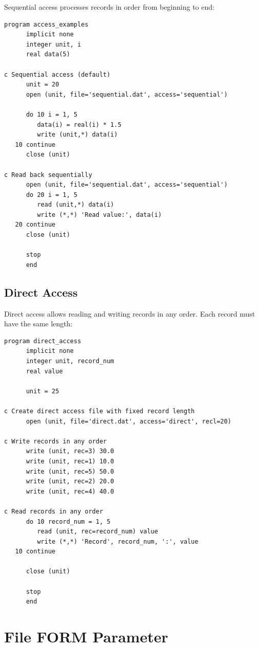 Sequential access processes records in order from beginning to end:

\begin{lstlisting}[style=fortran77]
      program access_examples
      implicit none
      integer unit, i
      real data(5)
      
c Sequential access (default)
      unit = 20
      open (unit, file='sequential.dat', access='sequential')
      
      do 10 i = 1, 5
         data(i) = real(i) * 1.5
         write (unit,*) data(i)
   10 continue
      close (unit)
      
c Read back sequentially
      open (unit, file='sequential.dat', access='sequential')
      do 20 i = 1, 5
         read (unit,*) data(i)
         write (*,*) 'Read value:', data(i)
   20 continue
      close (unit)
      
      stop
      end
\end{lstlisting}

\subsection{Direct Access}

Direct access allows reading and writing records in any order. Each record must have the same length:

\begin{lstlisting}[style=fortran77]
      program direct_access
      implicit none
      integer unit, record_num
      real value
      
      unit = 25
      
c Create direct access file with fixed record length
      open (unit, file='direct.dat', access='direct', recl=20)
      
c Write records in any order
      write (unit, rec=3) 30.0
      write (unit, rec=1) 10.0
      write (unit, rec=5) 50.0
      write (unit, rec=2) 20.0
      write (unit, rec=4) 40.0
      
c Read records in any order
      do 10 record_num = 1, 5
         read (unit, rec=record_num) value
         write (*,*) 'Record', record_num, ':', value
   10 continue
      
      close (unit)
      
      stop
      end
\end{lstlisting}

\section{File FORM Parameter}

